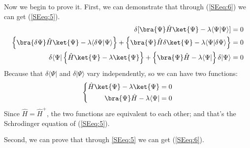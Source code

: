 Now we begin to prove it. First, we can demonstrate that through
(\ref{SEeq:6}) we can get (\ref{SEeq:5}).
\begin{align}\label{}
 \delta[\bra{\Psi}\hat{H}\ket{\Psi} - \lambda
\langle\Psi|\Psi\rangle] &= 0 \nonumber \\
\left\{\bra{\delta\Psi}\hat{H}\ket{\Psi} - \lambda
\langle\delta\Psi|\Psi\rangle \right\} +
\left\{\bra{\Psi}\hat{H}\delta\ket{\Psi} - \lambda
\langle\Psi|\delta\Psi\rangle\right\} &= 0 \nonumber \\
\delta\langle\Psi|\left\{\hat{H}\ket{\Psi} - \lambda
\ket{\Psi}\right\} + \left\{\bra{\Psi}\hat{H} - \lambda
\langle\Psi|\right\}\delta|\Psi\rangle &= 0
\end{align}
Because that $\delta\langle\Psi|$ and $\delta|\Psi\rangle$ vary
independently, so we can have two functions:
\begin{equation} \label{}
\left\{
\begin{aligned}
\hat{H}\ket{\Psi} - \lambda\ket{\Psi}    &= 0   \\
\bra{\Psi}\hat{H} - \lambda \langle\Psi| &= 0
\end{aligned}
\right.
\end{equation}
Since $\hat{H} = \hat{H}^{+}$, the two functions are equivalent to
each other; and that's the Schrodinger equation of (\ref{SEeq:5}).

Second, we can prove that through \ref{SEeq:5} we can get
(\ref{SEeq:6}).

